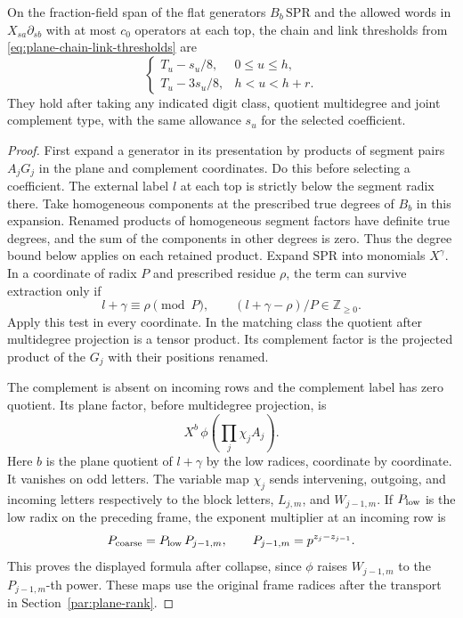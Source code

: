 \begin{proposition}\label{prop:plane-operator-prefix-orders}
On the fraction-field span of the flat generators \(B_b\,\mathrm{SPR}\)
and the allowed words in \(X_{sa}\partial_{sb}\) with at most
\(c_0\) operators at each top, the chain and link thresholds from \eqref{eq:plane-chain-link-thresholds} are
\[
 \begin{cases}T_u-s_u/8,&0\le u\le h,\\T_u-3s_u/8,&h<u<h+r.\end{cases}
\]
 They hold after taking any indicated digit class,
quotient multidegree and joint complement type, with the same
allowance \(s_u\) for the selected coefficient.
\end{proposition}

\begin{proof}
First expand a generator in its presentation by products of
segment pairs \(A_jG_j\) in the plane and complement
coordinates. Do this before selecting a coefficient. The external
label \(l\) at each top is strictly below the segment radix there.
Take homogeneous components at the prescribed true degrees of
\(B_b\) in this expansion. Renamed products of homogeneous segment
factors have definite true degrees, and the sum of the components
in other degrees is zero. Thus the degree bound below applies on
each retained product. Expand \(\mathrm{SPR}\) into monomials
\(X^\gamma\).
In a coordinate of radix \(P\) and prescribed residue \(\rho\), the term can survive extraction only if
\[
 l+\gamma\equiv\rho\pmod P,\qquad (l+\gamma-\rho)/P\in\mathbb Z_{\ge0}.
\]
Apply this test in every coordinate.
In the matching class the quotient after multidegree projection
is a tensor product. Its complement factor is the projected
product of the \(G_j\) with their positions renamed.

The
complement is absent on incoming rows and the complement label
has zero quotient. Its plane factor, before multidegree projection,
is
\[
        X^b\,\phi\!\left(\prod_j \chi_j A_j\right).
\]
Here \(b\) is the plane quotient of \(l+\gamma\) by the low
radices, coordinate by coordinate. It vanishes on odd letters.
The variable map \(\chi_j\) sends intervening, outgoing, and
incoming letters respectively to the block letters,
\(L_{j,m}\), and \(W_{j-1,m}\). If \(P_{\rm low}\) is the low
radix on the preceding frame, the exponent multiplier at an incoming
row is
\[
           P_{\rm coarse}=P_{\rm low}\,P_{j-1,m},
                 \qquad P_{j-1,m}=p^{z_j-z_{j-1}}.
\]
This proves the displayed formula after collapse, since \(\phi\)
raises \(W_{j-1,m}\) to the \(P_{j-1,m}\)-th power.
These maps use the original frame radices after the transport in
Section~\ref{par:plane-rank}.


\end{proof}
